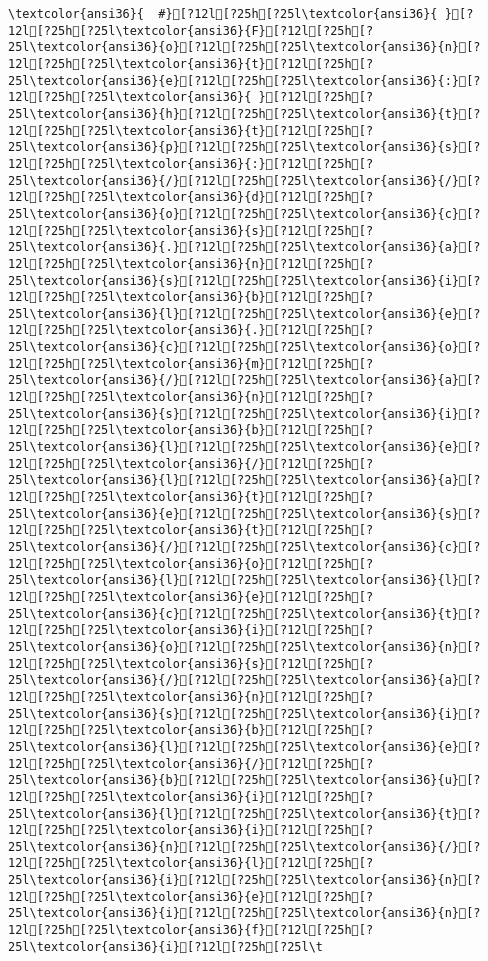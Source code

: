 \documentclass{scrartcl}
\begin{document}
\begin{Verbatim}
\textcolor{ansi36}{  #}[?12l[?25h[?25l\textcolor{ansi36}{ }[?12l[?25h[?25l\textcolor{ansi36}{F}[?12l[?25h[?25l\textcolor{ansi36}{o}[?12l[?25h[?25l\textcolor{ansi36}{n}[?12l[?25h[?25l\textcolor{ansi36}{t}[?12l[?25h[?25l\textcolor{ansi36}{e}[?12l[?25h[?25l\textcolor{ansi36}{:}[?12l[?25h[?25l\textcolor{ansi36}{ }[?12l[?25h[?25l\textcolor{ansi36}{h}[?12l[?25h[?25l\textcolor{ansi36}{t}[?12l[?25h[?25l\textcolor{ansi36}{t}[?12l[?25h[?25l\textcolor{ansi36}{p}[?12l[?25h[?25l\textcolor{ansi36}{s}[?12l[?25h[?25l\textcolor{ansi36}{:}[?12l[?25h[?25l\textcolor{ansi36}{/}[?12l[?25h[?25l\textcolor{ansi36}{/}[?12l[?25h[?25l\textcolor{ansi36}{d}[?12l[?25h[?25l\textcolor{ansi36}{o}[?12l[?25h[?25l\textcolor{ansi36}{c}[?12l[?25h[?25l\textcolor{ansi36}{s}[?12l[?25h[?25l\textcolor{ansi36}{.}[?12l[?25h[?25l\textcolor{ansi36}{a}[?12l[?25h[?25l\textcolor{ansi36}{n}[?12l[?25h[?25l\textcolor{ansi36}{s}[?12l[?25h[?25l\textcolor{ansi36}{i}[?12l[?25h[?25l\textcolor{ansi36}{b}[?12l[?25h[?25l\textcolor{ansi36}{l}[?12l[?25h[?25l\textcolor{ansi36}{e}[?12l[?25h[?25l\textcolor{ansi36}{.}[?12l[?25h[?25l\textcolor{ansi36}{c}[?12l[?25h[?25l\textcolor{ansi36}{o}[?12l[?25h[?25l\textcolor{ansi36}{m}[?12l[?25h[?25l\textcolor{ansi36}{/}[?12l[?25h[?25l\textcolor{ansi36}{a}[?12l[?25h[?25l\textcolor{ansi36}{n}[?12l[?25h[?25l\textcolor{ansi36}{s}[?12l[?25h[?25l\textcolor{ansi36}{i}[?12l[?25h[?25l\textcolor{ansi36}{b}[?12l[?25h[?25l\textcolor{ansi36}{l}[?12l[?25h[?25l\textcolor{ansi36}{e}[?12l[?25h[?25l\textcolor{ansi36}{/}[?12l[?25h[?25l\textcolor{ansi36}{l}[?12l[?25h[?25l\textcolor{ansi36}{a}[?12l[?25h[?25l\textcolor{ansi36}{t}[?12l[?25h[?25l\textcolor{ansi36}{e}[?12l[?25h[?25l\textcolor{ansi36}{s}[?12l[?25h[?25l\textcolor{ansi36}{t}[?12l[?25h[?25l\textcolor{ansi36}{/}[?12l[?25h[?25l\textcolor{ansi36}{c}[?12l[?25h[?25l\textcolor{ansi36}{o}[?12l[?25h[?25l\textcolor{ansi36}{l}[?12l[?25h[?25l\textcolor{ansi36}{l}[?12l[?25h[?25l\textcolor{ansi36}{e}[?12l[?25h[?25l\textcolor{ansi36}{c}[?12l[?25h[?25l\textcolor{ansi36}{t}[?12l[?25h[?25l\textcolor{ansi36}{i}[?12l[?25h[?25l\textcolor{ansi36}{o}[?12l[?25h[?25l\textcolor{ansi36}{n}[?12l[?25h[?25l\textcolor{ansi36}{s}[?12l[?25h[?25l\textcolor{ansi36}{/}[?12l[?25h[?25l\textcolor{ansi36}{a}[?12l[?25h[?25l\textcolor{ansi36}{n}[?12l[?25h[?25l\textcolor{ansi36}{s}[?12l[?25h[?25l\textcolor{ansi36}{i}[?12l[?25h[?25l\textcolor{ansi36}{b}[?12l[?25h[?25l\textcolor{ansi36}{l}[?12l[?25h[?25l\textcolor{ansi36}{e}[?12l[?25h[?25l\textcolor{ansi36}{/}[?12l[?25h[?25l\textcolor{ansi36}{b}[?12l[?25h[?25l\textcolor{ansi36}{u}[?12l[?25h[?25l\textcolor{ansi36}{i}[?12l[?25h[?25l\textcolor{ansi36}{l}[?12l[?25h[?25l\textcolor{ansi36}{t}[?12l[?25h[?25l\textcolor{ansi36}{i}[?12l[?25h[?25l\textcolor{ansi36}{n}[?12l[?25h[?25l\textcolor{ansi36}{/}[?12l[?25h[?25l\textcolor{ansi36}{l}[?12l[?25h[?25l\textcolor{ansi36}{i}[?12l[?25h[?25l\textcolor{ansi36}{n}[?12l[?25h[?25l\textcolor{ansi36}{e}[?12l[?25h[?25l\textcolor{ansi36}{i}[?12l[?25h[?25l\textcolor{ansi36}{n}[?12l[?25h[?25l\textcolor{ansi36}{f}[?12l[?25h[?25l\textcolor{ansi36}{i}[?12l[?25h[?25l\t
\end{Verbatim}
\end{document}

